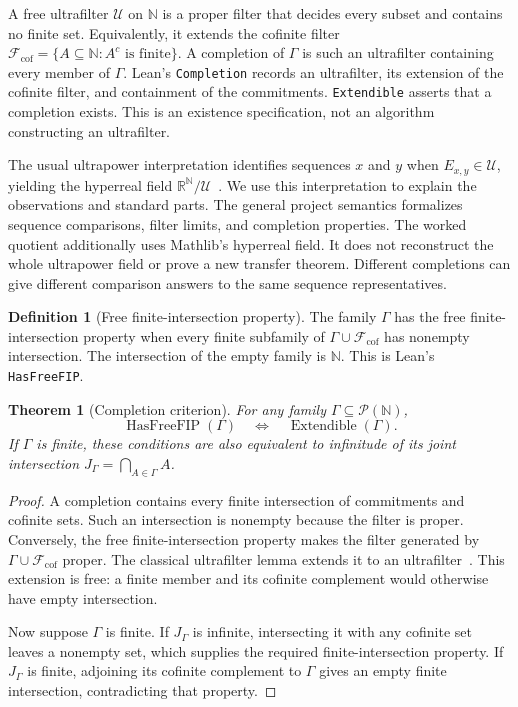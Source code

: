 \documentclass[11pt,a4paper]{article}
\theoremstyle{result}
\newtheorem{theorem}{Theorem}
\theoremstyle{definition}
\newtheorem{definition}{Definition}
\newcommand{\N}{\mathbb{N}}
\newcommand{\R}{\mathbb{R}}
\newcommand{\PUF}{\mathcal{U}}
\newcommand{\code}[1]{\texttt{#1}}
\begin{document}
A free ultrafilter $\PUF$ on $\N$ is a proper filter that decides every subset and contains no finite set. Equivalently, it extends the cofinite filter $\mathcal F_{\mathrm{cof}}=\{A\subseteq\N:A^c\text{ is finite}\}$. A completion of $\Gamma$ is such an ultrafilter containing every member of $\Gamma$. Lean's \code{Completion} records an ultrafilter, its extension of the cofinite filter, and containment of the commitments. \code{Extendible} asserts that a completion exists. This is an existence specification, not an algorithm constructing an ultrafilter.

The usual ultrapower interpretation identifies sequences $x$ and $y$ when $E_{x,y}\in\PUF$, yielding the hyperreal field $\R^\N/\PUF$~\cite{Robinson1966}. We use this interpretation to explain the observations and standard parts. The general project semantics formalizes sequence comparisons, filter limits, and completion properties. The worked quotient additionally uses Mathlib's hyperreal field. It does not reconstruct the whole ultrapower field or prove a new transfer theorem. Different completions can give different comparison answers to the same sequence representatives.

\begin{definition}[Free finite-intersection property]
  The family $\Gamma$ has the free finite-intersection property when every finite subfamily of $\Gamma\cup\mathcal F_{\mathrm{cof}}$ has nonempty intersection. The intersection of the empty family is $\N$. This is Lean's \code{HasFreeFIP}.
\end{definition}

\begin{theorem}[Completion criterion]\label{thm:completion}
  For any family $\Gamma\subseteq\mathcal P(\N)$,
  \[
    \operatorname{HasFreeFIP}(\Gamma)
    \quad\Longleftrightarrow\quad
    \operatorname{Extendible}(\Gamma).
  \]
  If $\Gamma$ is finite, these conditions are also equivalent to infinitude of its joint intersection $J_\Gamma=\bigcap_{A\in\Gamma}A$.
\end{theorem}
\begin{proof}
  A completion contains every finite intersection of commitments and cofinite sets. Such an intersection is nonempty because the filter is proper. Conversely, the free finite-intersection property makes the filter generated by $\Gamma\cup\mathcal F_{\mathrm{cof}}$ proper. The classical ultrafilter lemma extends it to an ultrafilter~\cite{Jech2003}. This extension is free: a finite member and its cofinite complement would otherwise have empty intersection.

  Now suppose $\Gamma$ is finite. If $J_\Gamma$ is infinite, intersecting it with any cofinite set leaves a nonempty set, which supplies the required finite-intersection property. If $J_\Gamma$ is finite, adjoining its cofinite complement to $\Gamma$ gives an empty finite intersection, contradicting that property.
\end{proof}
\end{document}
